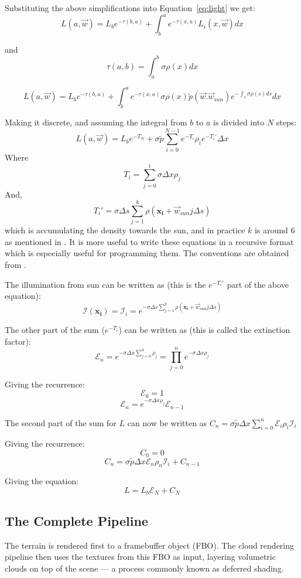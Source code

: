 Substituting the above simplifications into Equation~\ref{eq:light} we get:
\[
L(a, \vec{w}) = L_be^{-\tau(b, a)} + \int_b^a{e^{-\tau(x, a)}L_i(x, \vec{w})dx}
\]

and 
\[
\tau(a, b) = \int_a^b{\sigma\rho(x)dx}
\]

\[
L(a, \vec{w}) = L_be^{-\tau(b, a)} + \int_b^a{e^{-\tau(x, a)}\sigma\rho(x)\tilde{p}(\vec{w}.\vec{w}_{sun})
e^{-\int_c{\sigma\rho(s)ds}} dx}
\]

Making it discrete, and assuming the integral from $b$ to $a$ is divided into $N$ steps:
\[
L(a, \vec{w}) = L_be^{-T_N} + \sigma\tilde{p}\sum_{i=0}^{N-1}
e^{-T_i}\rho_ie^{-T_i'}\Delta{x}
\]
Where 
\[
T_i = \sum_{j=0}^{i}\sigma\Delta{x}\rho_j
\]
And, 
\[
T_i' = \sigma\Delta{s}\sum_{j=1}^{k}\rho(\mathbf{x_i} + \vec{w}_{sun}j\Delta{s})
\]
which is accumulating the density towards the sun, and in practice $k$ is around 6 as mentioned in \cite{guerrillagames2025nubis}. It is more useful to write these equations in a recursive format which is especially useful for programming them. The conventions are obtained from \cite{palenik2016volumetricclouds}.

The illumination from sun can be written as (this is the $e^{-T_i'}$ part of the above equation):
\[
\mathcal{I}(\mathbf{x_i}) = \mathcal{I}_i = e^{-\sigma\Delta{s}\sum_{j=1}^{k}\rho(\mathbf{x_i} + \vec{w}_{sun}j\Delta{s})}
\]

The other part of the sum ($e^{-T_i}$) can be written as (this is called the extinction factor):
\[
\mathcal{E}_n = e^{-\sigma\Delta{x}\sum_{j=0}^{n}{\rho_j}} = \prod_{j=0}^{n}{e^{-\sigma\Delta{x}\rho_j}}
\]

Giving the recurrence:
\[
\mathcal{E}_0 = 1
\]
\[
\mathcal{E}_n = e^{-\sigma\Delta{x}\rho_j}\mathcal{E}_{n-1}
\]

The second part of the sum for $L$ can now be written as $C_n = \sigma\tilde{p}\Delta{x}\sum_{i=0}^{n}{\mathcal{E}_i}\rho_i\mathcal{I}_i$ 

Giving the recurrence:
\[
C_0 = 0
\]
\[
C_n = \sigma\tilde{p}\Delta{x}\mathcal{E}_n\rho_n\mathcal{I}_i + C_{n-1}
\]

Giving the equation:
\[
L = L_b\mathcal{E}_N + C_N
\]


\subsection{The Complete Pipeline}
The terrain is rendered first to a framebuffer object (FBO). The cloud rendering pipeline then uses the textures from this FBO as input, layering volumetric clouds on top of the scene — a process commonly known as deferred shading.

